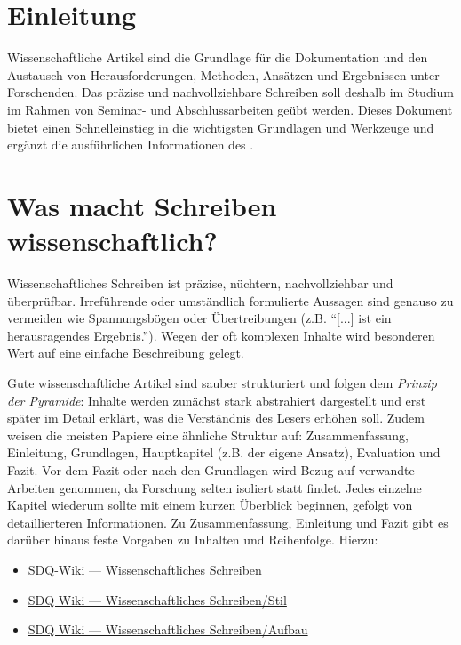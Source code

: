 \section{Einleitung}
\label{sec:Einleitung}

Wissenschaftliche Artikel sind die Grundlage für die Dokumentation und den Austausch von Herausforderungen, Methoden, Ansätzen und Ergebnissen unter Forschenden. 
Das präzise und nachvollziehbare Schreiben soll deshalb im Studium im Rahmen von Seminar- und Abschlussarbeiten geübt werden. 
Dieses Dokument bietet einen Schnelleinstieg in die wichtigsten Grundlagen und Werkzeuge und ergänzt die ausführlichen Informationen des .


\section{Was macht Schreiben wissenschaftlich?}
\label{sec:WissenschaftlichesSchreiben}

Wissenschaftliches Schreiben ist präzise, nüchtern, nachvollziehbar und überprüfbar. 
Irreführende oder umständlich formulierte Aussagen sind genauso zu vermeiden wie Spannungsbögen oder Übertreibungen (z.B. \enquote{[...] ist ein herausragendes Ergebnis.}). 
Wegen der oft komplexen Inhalte wird besonderen Wert auf eine einfache Beschreibung gelegt.

Gute wissenschaftliche Artikel sind sauber strukturiert und folgen dem \emph{Prinzip der Pyramide}:
Inhalte werden zunächst stark abstrahiert dargestellt und erst später im Detail erklärt, was die Verständnis des Lesers erhöhen soll.
Zudem weisen die meisten Papiere eine ähnliche Struktur auf: Zusammenfassung, Einleitung, Grundlagen, Hauptkapitel (z.B. der eigene Ansatz), Evaluation und Fazit.
Vor dem Fazit oder nach den Grundlagen wird Bezug auf verwandte Arbeiten genommen, da Forschung selten isoliert statt findet.
Jedes einzelne Kapitel wiederum sollte mit einem kurzen Überblick beginnen, gefolgt von detaillierteren Informationen.
Zu Zusammenfassung, Einleitung und Fazit gibt es darüber hinaus feste Vorgaben zu Inhalten und Reihenfolge.
Hierzu:

\smallskip
\begin{itemize}[label={\symbolInfo}]
    \item \href{https://sdqweb.ipd.kit.edu/wiki/Wissenschaftliches_Schreiben}{SDQ-Wiki --- Wissenschaftliches Schreiben }
    \item \href{https://sdqweb.ipd.kit.edu/wiki/Wissenschaftliches_Schreiben/Stil}{SDQ Wiki --- Wissenschaftliches Schreiben/Stil}
    \item \href{https://sdqweb.ipd.kit.edu/wiki/Wissenschaftliches_Schreiben/Aufbau}{SDQ Wiki --- Wissenschaftliches Schreiben/Aufbau}
\end{itemize}


